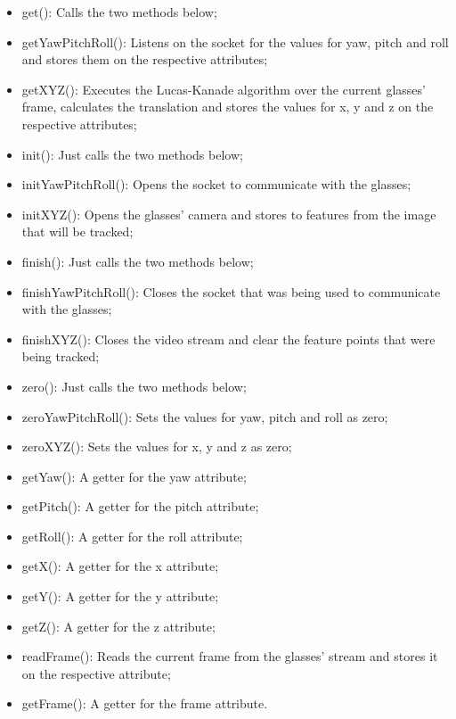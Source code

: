 \documentclass[msc, a4paper, classic, en]{ufbathesis}
\begin{document}
\begin{itemize}
  \item get(): Calls the two methods below;
  \item getYawPitchRoll(): Listens on the socket for the values for yaw, pitch and roll and stores them on the respective attributes;
  \item getXYZ(): Executes the Lucas-Kanade algorithm over the current glasses' frame, calculates the translation and stores the values for x, y and z on the respective attributes;
  \item init(): Just calls the two methods below;
  \item initYawPitchRoll(): Opens the socket to communicate with the glasses;
  \item initXYZ(): Opens the glasses' camera and stores to features from the image that will be tracked;
  \item finish(): Just calls the two methods below;
  \item finishYawPitchRoll(): Closes the socket that was being used to communicate with the glasses;
  \item finishXYZ(): Closes the video stream and clear the feature points that were being tracked;
  \item zero(): Just calls the two methods below;
  \item zeroYawPitchRoll(): Sets the values for yaw, pitch and roll as zero;
  \item zeroXYZ(): Sets the values for x, y and z as zero;
  \item getYaw(): A getter for the yaw attribute;
  \item getPitch(): A getter for the pitch attribute;
  \item getRoll(): A getter for the roll attribute;
  \item getX(): A getter for the x attribute;
  \item getY(): A getter for the y attribute;
  \item getZ(): A getter for the z attribute;
  \item readFrame(): Reads the current frame from the glasses' stream and stores it on the respective attribute;
  \item getFrame(): A getter for the frame attribute.
\end{itemize}



\end{document}
